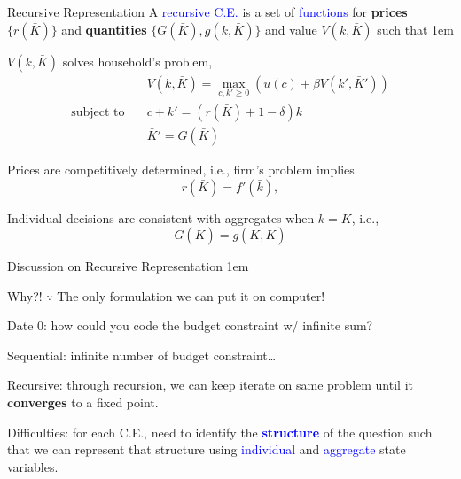 \documentclass[11pt,aspectratio=43,usenames,dvipsnames]{beamer}
\newcommand{\blue}[1]{\textcolor{blue}{#1}}
\let\olditemize=\itemize
\let\endolditemize=\enditemize
\renewenvironment{itemize}{\olditemize \itemsep1em}{\endolditemize}
\let\oldenumerate=\enumerate
\let\endoldenumerate=\endenumerate
\renewenvironment{enumerate}{\oldenumerate \itemsep1em}{ \endoldenumerate}
\theoremstyle{definition}
\begin{document}
\begin{frame}{Recursive Representation}
\label{slide:Recursive_Representation}
\small
    A \blue{recursive C.E.} is a set of \blue{functions} for \textbf{prices} $ \{r(\bar{K})\} $ and \textbf{quantities} $ \{G(\bar{K}), g(k, \bar{K})\}$ and value $ V(k, \bar{K}) $ such that
    \begin{enumerate}
        \item $ V(k, \bar{K}) $ solves household's problem,
        \begin{align}
                & V(k, \bar{K}) = \max_{c, k' \ge 0} \left(
                    u(c) + \beta V(k', \bar{K}')
                \right)
            \\
            \text{subject to} \quad
                & c + k' = (r(\bar{K}) + 1 - \delta) k
            \\
                & \bar{K}' = G(\bar{K})
        \end{align}
        \item Prices are competitively determined, i.e., firm's problem implies
        \begin{equation*}
            r(\bar{K}) = f'(\bar{k})
        ,\end{equation*}
        \item Individual decisions are consistent with aggregates when $ k = \bar{K} $, i.e.,
        \begin{equation*}
            G(\bar{K}) = g(\bar{K}, \bar{K})
        \end{equation*}

    \end{enumerate}


\end{frame}

\begin{frame}{Discussion on Recursive Representation}
\label{slide:Discussion_on_Recursive_Representation}
    \begin{itemize}
        \item Why?! $ \because  $ The only formulation we can put it on computer!
        \item Date 0: how could you code the budget constraint w/ infinite sum?
        \item Sequential: infinite number of budget constraint\ldots
        \item Recursive: through recursion, we can keep iterate on same problem until it \textbf{converges} to a fixed point.
        \item Difficulties: for each C.E., need to identify the \blue{\textbf{structure}} of the question such that we can represent that structure using \blue{individual} and \blue{aggregate} state variables.
    \end{itemize}

\end{frame}
\end{document}
